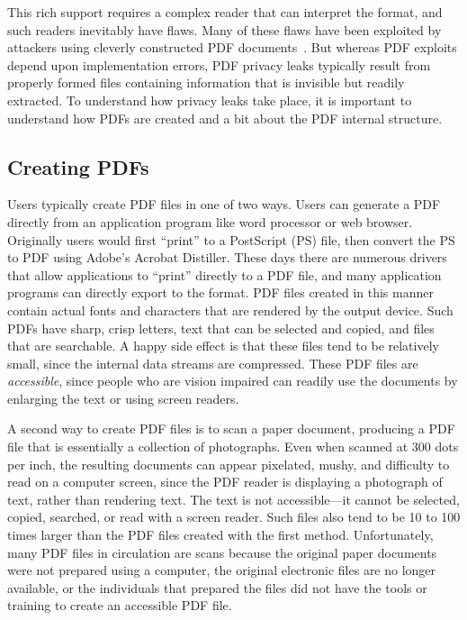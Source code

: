 \documentclass{article}
\begin{document}
This rich support requires a complex reader that can interpret the
format, and such readers inevitably have flaws. Many of these flaws
have been exploited by attackers using cleverly constructed
PDF documents~\cite{5705599}. But whereas PDF exploits depend upon
implementation errors, PDF privacy leaks typically result from
properly formed files  containing information that is invisible but
readily extracted. To understand how privacy leaks take place, it
is important to understand how PDFs are created and a bit
about the PDF internal structure.

\subsection{Creating PDFs}

Users typically create PDF files in one of two ways. Users can
generate a PDF directly from an application program like word
processor or web browser.  Originally users would first ``print'' to a
PostScript (PS) file, then convert the PS to PDF using Adobe's
Acrobat Distiller. These days there are numerous drivers that allow
applications to ``print'' directly to a PDF file, and many application
programs can directly export to the format. PDF files created in this
manner contain actual fonts and characters that are rendered by the
output device. Such PDFs have sharp, crisp letters, text that can be
selected and copied, and files that are searchable. A happy side
effect is that these files tend to be relatively small, since the
internal data streams are compressed. These PDF files are 
\emph{accessible}, since people who are vision impaired can readily use
the documents by enlarging the text or using screen readers.

A second way to create PDF files is to scan a paper
document, producing a PDF file that is essentially a collection of
photographs. Even when scanned at 300 dots per inch, the
resulting documents can appear pixelated, mushy, and difficulty to read on a
computer screen, since the PDF reader is displaying a photograph of text,
rather than rendering text. The
text is not accessible---it cannot be selected, copied, searched, or
read with a screen reader. Such files also tend to be 10 to 100 times
larger than the PDF files created with the first
method. Unfortunately, many PDF files in circulation are scans because
the original paper documents were not prepared using a computer,
the original electronic files are no longer  available, or the
individuals that prepared the files did not have the tools or 
training to create an accessible PDF file.
\end{document}
